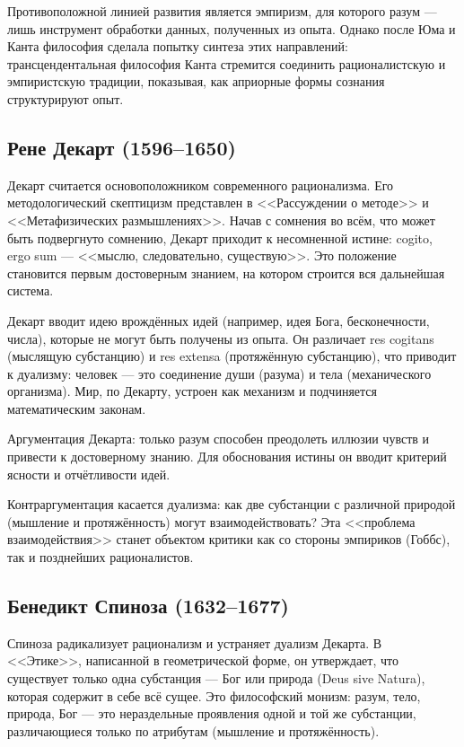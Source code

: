 \documentclass[12pt,a4paper]{article}
\begin{document}
	Противоположной линией развития является эмпиризм, для которого разум — лишь инструмент обработки данных, полученных из опыта. Однако после Юма и Канта философия сделала попытку синтеза этих направлений: трансцендентальная философия Канта стремится соединить рационалистскую и эмпиристскую традиции, показывая, как априорные формы сознания структурируют опыт.
	
	\subsection{Рене Декарт (1596–1650)}	
	Декарт считается основоположником современного рационализма. Его методологический скептицизм представлен в <<Рассуждении о методе>> и <<Метафизических размышлениях>>. Начав с сомнения во всём, что может быть подвергнуто сомнению, Декарт приходит к несомненной истине: cogito, ergo sum — <<мыслю, следовательно, существую>>. Это положение становится первым достоверным знанием, на котором строится вся дальнейшая система.
	
	Декарт вводит идею врождённых идей (например, идея Бога, бесконечности, числа), которые не могут быть получены из опыта. Он различает res cogitans (мыслящую субстанцию) и res extensa (протяжённую субстанцию), что приводит к дуализму: человек — это соединение души (разума) и тела (механического организма). Мир, по Декарту, устроен как механизм и подчиняется математическим законам.
	
	Аргументация Декарта: только разум способен преодолеть иллюзии чувств и привести к достоверному знанию. Для обоснования истины он вводит критерий ясности и отчётливости идей.
	
	Контраргументация касается дуализма: как две субстанции с различной природой (мышление и протяжённость) могут взаимодействовать? Эта <<проблема взаимодействия>> станет объектом критики как со стороны эмпириков (Гоббс), так и позднейших рационалистов.
	
	\subsection{Бенедикт Спиноза (1632–1677)}
	
	Спиноза радикализует рационализм и устраняет дуализм Декарта. В <<Этике>>, написанной в геометрической форме, он утверждает, что существует только одна субстанция — Бог или природа (Deus sive Natura), которая содержит в себе всё сущее. Это философский монизм: разум, тело, природа, Бог — это нераздельные проявления одной и той же субстанции, различающиеся только по атрибутам (мышление и протяжённость).
	
\end{document}
